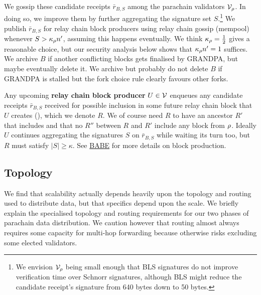 We gossip these candidate receipts $\bar{r}_{B,S}$ among the parachain validators $\mathcal{V}_{\rho}$.  In doing so, we improve them by further aggregating the signature set $S$.\footnote{We envision $\mathcal{V}_{\rho}$ being small enough that BLS signatures do not improve verification time over Schnorr signatures, although BLS might reduce the candidate receipt's signature from 640 bytes down to 50 bytes.}  We publish $\bar{r}_{B,S}$ for relay chain block producers using relay chain gossip (mempool) whenever $S > \kappa_{\rho} n'$, assuming this happens eventually.  We think $\kappa_{\rho} = {1\over2}$ gives a reasonable choice, but our security analysis below shows that $\kappa_{\rho} n' = 1$ suffices.  We archive $B$ if another conflicting blocks gets finalised by GRANDPA, but maybe eventually delete it.  We archive but probably do not delete $B$ if GRANDPA is stalled but the fork choice rule clearly favours other forks.  

\smallskip

Any upcoming {\bf relay chain block producer} $U \in \mathcal{V}$ enqueues any candidate receipts $\bar{r}_{B,S}$ received for possible inclusion in some future relay chain block that $U$ creates (), which we denote $R$.  We of course need $R$ to have an ancestor $R'$ that includes  and that no $R''$ between $R$ and $R'$ include any block from $\rho$.  Ideally $U$ continues aggregating the signatures $S$ on $\bar{r}_{B,S}$ while waiting its turn too, but $R$ must satisfy $|S| \ge \kappa$.  See \href{http://research.web3.foundation/en/latest/polkadot/BABE/Babe/}{BABE} for more details on block production.


\subsection{Topology}

We find that scalability actually depends heavily upon the topology and routing used to distribute data, but that specifics depend upon the scale.  We briefly explain the specialised topology and routing requirements for our two phases of parachain data distribution.  We caution however that routing almost always requires some capacity for multi-hop forwarding because otherwise risks excluding some elected validators.  


